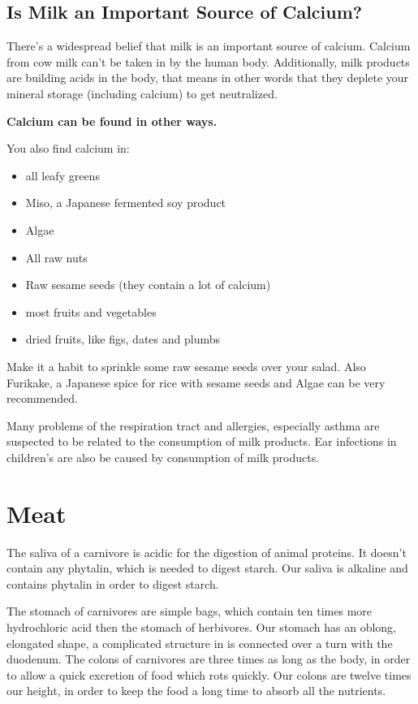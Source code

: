 \documentclass[../main.tex]{subfiles}
\begin{document}
\subsection{Is Milk an Important Source of Calcium?}

There's a widespread belief that milk is an important source of calcium.
Calcium from cow milk can't be taken in by the human body.
Additionally, milk products are building acids in the body, that means in other words
that they deplete your mineral storage (including calcium) to get neutralized.

\textbf{Calcium can be found in other ways.}

You also find calcium in:
\begin{itemize}
\item all leafy greens
\item Miso, a Japanese fermented soy product
\item Algae
\item All raw nuts
\item Raw sesame seeds (they contain a lot of calcium)
\item most fruits and vegetables
\item dried fruits, like figs, dates and plumbs
\end{itemize}

Make it a habit to sprinkle some raw sesame seeds over your salad.
Also Furikake, a Japanese spice for rice with sesame seeds and Algae can be very recommended.

Many problems of the respiration tract and allergies,
especially asthma are suspected to be related to
the consumption of milk products.
Ear infections in children's are also be caused by consumption of milk products.

\section{Meat}

The saliva of a carnivore is acidic for the digestion of animal proteins.
It doesn't contain any phytalin, which is needed to digest starch.
Our saliva is alkaline and contains phytalin in order to digest starch.


The stomach of carnivores are simple bags, which contain ten times more hydrochloric acid then the stomach of herbivores.
Our stomach has an oblong, elongated shape, a complicated structure in is connected over a turn with the duodenum.
The colons of carnivores are three times as long as the body, in order to allow a quick excretion of food which rots quickly.
Our colons are twelve times our height, in order to keep the food a long time to absorb all the nutrients.
\end{document}
